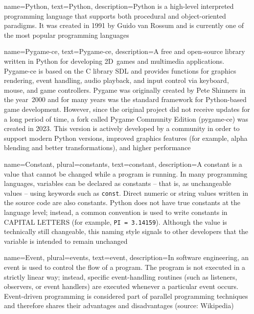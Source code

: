 {
	name={Python},
	text={Python},
	description={Python is a high-level interpreted programming language that supports both procedural and object-oriented paradigms. It was created in 1991 by Guido van Rossum and is currently	one of the most popular programming languages}
}

{
	name={Pygame-ce},
	text={Pygame-ce},
	description={A free and open-source library written in Python for developing 2D~games and multimedia applications. Pygame-ce is based on the C library SDL and provides functions for graphics rendering, event handling, audio playback, and input control via keyboard, mouse, and game controllers. Pygame was originally created by Pete Shinners in the year~2000 and for many years was the standard framework for Python-based game development. However, since the original project did not receive updates	for a long period of time, a fork called Pygame Community Edition (pygame-ce) was created in 2023. This version is actively developed by a community in order to support modern Python versions, improved graphics features (for example, alpha blending and better transformations), and higher performance}
}

{
	name={Constant},
	plural={constants},
	text={constant},
	description={A constant is a value that cannot be changed while a program is running. In many programming languages, variables can be declared as constants -- that is, as unchangeable values -- using keywords such as \texttt{const}. Direct numeric or string values written in the source code are also constants. Python does not have true constants at the language level; instead, a common convention is used to write constants in CAPITAL LETTERS (for example, \texttt{PI = 3.14159}). Although the value is technically still changeable, this naming style signals to other developers that the variable is intended to remain unchanged}
}

{
	name={Event},
	plural={events},
	text={event},
	description={In software engineering, an event is used to control the flow of a program. The program is not executed in a strictly linear way; instead, specific event-handling routines (such as listeners, observers, or event handlers) are executed whenever a particular event occurs. Event-driven programming is considered part of parallel programming techniques and therefore shares their advantages and disadvantages (source: Wikipedia)}
}

